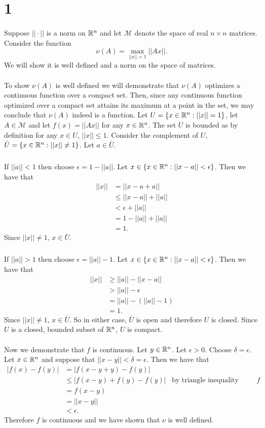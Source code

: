 \documentclass[letterpaper,12pt,oneside,onecolumn]{article}
\newcommand{\cM}{\mathcal{M}} \newcommand{\cN}{\mathcal{N}}
\begin{document}
\section{1}
\paragraph{}
Suppose $||\cdot||$ is a norm on $\mathbb{R}^n$ and let $\cM$ denote the space of real $n \times n$ matrices. Consider the function $$\nu(A) = \max_{||x||=1} ||Ax||.$$
We will show it is well defined and a norm on the space of matrices.
\paragraph{}
To show $\nu(A)$ is well defined we will demonstrate that $\nu(A)$ optimizes a continuous function over a compact set. Then, since any continuous function optimized over a compact set attains its maximum at a point in the set, we may conclude that $\nu(A)$ indeed is a function. Let $U = \{x \in \mathbb{R}^n: ||x|| = 1\}$, let $A\in \cM$ and let $f(x) = ||Ax||$ for any $x \in \mathbb{R}^n$. The set $U$ is bounded as by definition for any $x \in U$, $||x|| \leq 1$. Consider the complement of $U$, $\bar{U} = \{x \in \mathbb{R}^n: ||x|| \neq 1\}$. Let $a \in \bar{U}$.
\subparagraph{}
If $||a|| < 1$ then choose $\epsilon = 1 - ||a||$. Let $x \in \{x \in \mathbb{R}^n: ||x-a|| < \epsilon\}$. Then we have that
\begin{align*}
||x|| &= ||x-a + a|| \\
&\leq ||x-a|| + ||a|| \\
&< \epsilon + ||a|| \\
&= 1 - ||a|| + ||a|| \\
&= 1.
\end{align*} 
Since $||x|| \neq 1$, $x\in \bar{U}$.
\subparagraph{}
If $||a|| > 1$ then choose $\epsilon = ||a|| - 1$. Let $x \in \{x \in \mathbb{R}^n: ||x-a|| < \epsilon\}$. Then we have that
\begin{align*}
||x|| &\geq ||a|| - ||x-a|| \\
&> ||a|| - \epsilon \\
&= ||a|| -(||a|| - 1) \\
&= 1.
\end{align*}
Since $||x|| \neq 1$, $x \in \bar{U}$. So in either case, $\bar{U}$ is open and therefore $U$ is closed. 
Since $U$ is a closed, bounded subset of $\mathbb{R}^n$, $U$ is compact.
\paragraph{}
Now we demonstrate that $f$ is continuous. Let $y \in \mathbb{R}^n$. Let $\epsilon > 0 $. Choose $\delta = \epsilon$. Let $x \in \mathbb{R}^n$ and suppose that $||x - y|| < \delta = \epsilon$. Then we have that
\begin{align*}
|f(x) - f(y)| &= |f(x - y + y) - f(y)| \\
&\leq |f(x-y) + f(y) -f(y)| &\text{by triangle inequality applied to $f$}\\
&= f(x-y) \\
&= ||x-y|| \\
&< \epsilon.
\end{align*}
Therefore $f$ is continuous and we have shown that $\nu$ is well defined.
\end{document}
